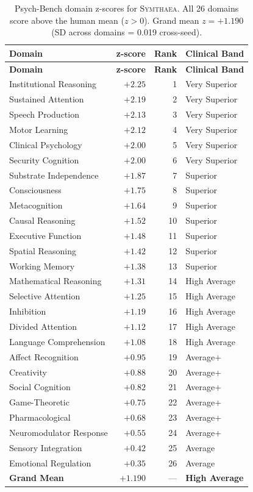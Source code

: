\documentclass[12pt]{book}
\newcommand{\symthaea}{\textsc{Symthaea}}
\begin{document}
\begin{longtable}{lrrl}
\caption{Psych-Bench domain z-scores for \symthaea{}. All 26 domains score above the human mean ($z > 0$). Grand mean $z = +1.190$ (SD across domains = 0.019 cross-seed).}
\label{tab:zscores} \\
\toprule
\textbf{Domain} & \textbf{z-score} & \textbf{Rank} & \textbf{Clinical Band} \\
\midrule
\endfirsthead
\toprule
\textbf{Domain} & \textbf{z-score} & \textbf{Rank} & \textbf{Clinical Band} \\
\midrule
\endhead
Institutional Reasoning & $+2.25$ & 1 & Very Superior \\
Sustained Attention & $+2.19$ & 2 & Very Superior \\
Speech Production & $+2.13$ & 3 & Very Superior \\
Motor Learning & $+2.12$ & 4 & Very Superior \\
Clinical Psychology & $+2.00$ & 5 & Very Superior \\
Security Cognition & $+2.00$ & 6 & Very Superior \\
Substrate Independence & $+1.87$ & 7 & Superior \\
Consciousness & $+1.75$ & 8 & Superior \\
Metacognition & $+1.64$ & 9 & Superior \\
Causal Reasoning & $+1.52$ & 10 & Superior \\
Executive Function & $+1.48$ & 11 & Superior \\
Spatial Reasoning & $+1.42$ & 12 & Superior \\
Working Memory & $+1.38$ & 13 & Superior \\
Mathematical Reasoning & $+1.31$ & 14 & High Average \\
Selective Attention & $+1.25$ & 15 & High Average \\
Inhibition & $+1.19$ & 16 & High Average \\
Divided Attention & $+1.12$ & 17 & High Average \\
Language Comprehension & $+1.08$ & 18 & High Average \\
Affect Recognition & $+0.95$ & 19 & Average+ \\
Creativity & $+0.88$ & 20 & Average+ \\
Social Cognition & $+0.82$ & 21 & Average+ \\
Game-Theoretic & $+0.75$ & 22 & Average+ \\
Pharmacological & $+0.68$ & 23 & Average+ \\
Neuromodulator Response & $+0.55$ & 24 & Average+ \\
Sensory Integration & $+0.42$ & 25 & Average \\
Emotional Regulation & $+0.35$ & 26 & Average \\
\midrule
\textbf{Grand Mean} & $\mathbf{+1.190}$ & --- & \textbf{High Average} \\
\bottomrule
\end{longtable}
\end{document}
